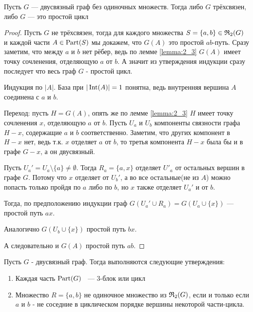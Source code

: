\begin{thm}[Теорема 2.1] \label{theorem:2_1}
	Пусть $G$ — двусвязный граф без одиночных множеств.
	Тогда либо $G$ трёхсвязен, либо $G$ — это простой цикл
\end{thm}

\begin{proof}
	Пусть $G$ не трёхсвязен, тогда для каждого множества $S = \{a, b \} \in \mathfrak{R}_2(G)$ и каждой части $A \in \operatorname{Part}(S)$ мы докажем, что $G(A)$ это простой $ab$-путь.
	Сразу заметим, что между $a$ и $b$ нет рёбер, ведь по лемме \ref{lemma:2_3} $G(A)$ имеет точку сочленения, отделяющую $a$ от $b$.
	А значит из утверждения индукции сразу последует что весь граф $G$ - простой цикл.

	Индукция по $|A|$.
	База при $|\operatorname{Int}(A)| = 1$ понятна, ведь внутренняя вершина $A$ соединена с $a$ и $b$.

	Переход: пусть $H = G(A)$, опять же по лемме \ref{lemma:2_3} $H$ имеет точку сочленения $x$, отделяющую $a$ от $b$.
	Пусть $U_a$ и $U_b$ компоненты связности графа $H - x$, содержащие $a$ и $b$ соответственно.
	Заметим, что других компонент в $H - x$ нет, ведь т.к. $x$ отделяет $a$ от $b$, то третья компонента $H - x$ была бы и в графе $G - x$, а он двусвязный.

	Пусть $U_a' = U_a \setminus \{a\} \neq \emptyset$.
	Тогда $R_a = \{a, x \}$ отделяет $U'_a$ от остальных вершин в графе $G$.
	Потому что $x$ отделяет от $U_b'$, а во все остальные(не из $A$) можно попасть только пройдя по $a$ либо по $b$, но $x$ также отделяет $U_a'$ и от $b$.

	Тогда, по предположению индукции граф $G(U_a' \cup R_a) = G(U_a \cup \{x\})$ — простой путь $ax$.

	Аналогично $G(U_b \cup \{x\})$ простой путь $bx$.

	А следовательно и $G(A)$ простой путь $ab$.
\end{proof}

\begin{thm}[Теорема 2.2] \label{theorem:2_2}
	Пусть $G$ - двусвязный граф.
	Тогда выполняются следующие утверждения:

	\begin{enumerate}
		\item Каждая часть $\operatorname{Part}(G)$ ~--- 3-блок или цикл
		\item Множество $R = \{a, b\}$ не одиночное множество из $\mathfrak{R}_2(G)$, если и только если $a$ и $b$ - не соседние в циклическом порядке вершины некоторой части-цикла.
	\end{enumerate}

\end{thm}

